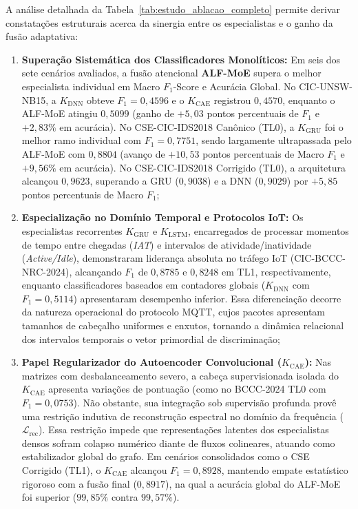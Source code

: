 A análise detalhada da Tabela~\ref{tab:estudo_ablacao_completo} permite derivar constatações
estruturais acerca da sinergia entre os especialistas e o ganho da fusão adaptativa:
\begin{enumerate}
    \item \textbf{Superação Sistemática dos Classificadores Monolíticos:}
    Em seis dos sete cenários avaliados, a fusão atencional \textbf{ALF-MoE} supera o melhor
    especialista individual em Macro $F_1$-Score e Acurácia Global. No CIC-UNSW-NB15, a
    $K_{\mathrm{DNN}}$ obteve $F_1 = 0{,}4596$ e o $K_{\mathrm{CAE}}$ registrou
    $0{,}4570$, enquanto o ALF-MoE atingiu $0{,}5099$ (ganho de $+5{,}03$ pontos percentuais de $F_1$ e
    $+2{,}83\%$ em acurácia). No CSE-CIC-IDS2018 Canônico (TL0), a $K_{\mathrm{GRU}}$ foi o
    melhor ramo individual com $F_1 = 0{,}7751$, sendo largamente ultrapassada pelo ALF-MoE com
    $0{,}8804$ (avanço de $+10{,}53$ pontos percentuais de Macro $F_1$ e $+9{,}56\%$ em acurácia). No
    CSE-CIC-IDS2018 Corrigido (TL0), a arquitetura alcançou $0{,}9623$, superando a GRU ($0{,}9038$) e a
    DNN ($0{,}9029$) por $+5{,}85$ pontos percentuais de Macro $F_1$;
    
    \item \textbf{Especialização no Domínio Temporal e Protocolos IoT:}
    Os especialistas recorrentes $K_{\mathrm{GRU}}$ e $K_{\mathrm{LSTM}}$, encarregados
    de processar momentos de tempo entre chegadas (\emph{IAT}) e intervalos de atividade/inatividade
    (\emph{Active/Idle}), demonstraram liderança absoluta no tráfego IoT (CIC-BCCC-NRC-2024),
    alcançando $F_1$ de $0{,}8785$ e $0{,}8248$ em TL1, respectivamente, enquanto classificadores baseados
    em contadores globais ($K_{\mathrm{DNN}}$ com $F_1 = 0{,}5114$) apresentaram desempenho
    inferior. Essa diferenciação decorre da natureza operacional do protocolo MQTT, cujos pacotes
    apresentam tamanhos de cabeçalho uniformes e enxutos, tornando a dinâmica relacional dos intervalos
    temporais o vetor primordial de discriminação;
    
    \item \textbf{Papel Regularizador do Autoencoder Convolucional ($K_{\mathrm{CAE}}$):}
    Nas matrizes com desbalanceamento severo, a cabeça supervisionada isolada do
    $K_{\mathrm{CAE}}$ apresenta variações de pontuação (como no BCCC-2024 TL0 com
    $F_1 = 0{,}0753$). Não obstante, sua integração sob supervisão profunda provê uma restrição indutiva
    de reconstrução espectral no domínio da frequência ($\mathcal{L}_{\mathrm{rec}}$). Essa restrição
    impede que representações latentes dos especialistas densos sofram colapso numérico diante de fluxos
    colineares, atuando como estabilizador global do grafo. Em cenários consolidados como o CSE Corrigido
    (TL1), o $K_{\mathrm{CAE}}$ alcançou $F_1 = 0{,}8928$, mantendo empate estatístico rigoroso
    com a fusão final ($0{,}8917$), na qual a acurácia global do ALF-MoE foi superior ($99{,}85\%$
    contra $99{,}57\%$).
\end{enumerate}

